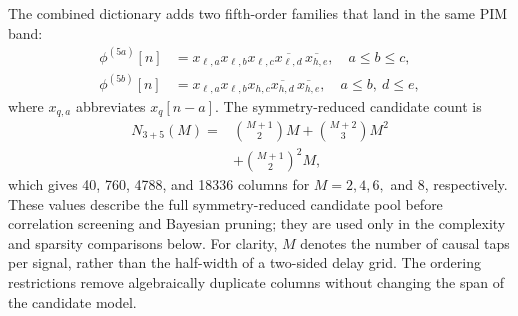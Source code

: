\documentclass[conference]{IEEEtran}
\begin{document}
The combined dictionary adds two fifth-order families that land in the same PIM band:
\begin{align}
 \phi^{(5a)}[n]&=x_{\ell,a}x_{\ell,b}x_{\ell,c}
                 \overline{x_{\ell,d}}\,\overline{x_{h,e}},
                 \quad a\leq b\leq c, \label{eq:im5a}\\
 \phi^{(5b)}[n]&=x_{\ell,a}x_{\ell,b}x_{h,c}
                 \overline{x_{h,d}}\,\overline{x_{h,e}},
                 \quad a\leq b,\ d\leq e, \label{eq:im5b}
\end{align}
where $x_{q,a}$ abbreviates $x_q[n-a]$. The symmetry-reduced candidate count is
\begin{equation}
\begin{split}
 N_{3+5}(M)={}&\binom{M+1}{2}M
 +\binom{M+2}{3}M^2\\
 &+\binom{M+1}{2}^{\!2}M,
\end{split}
\label{eq:n35}
\end{equation}
which gives 40, 760, 4788, and 18336 columns for $M=2,4,6,$ and $8$, respectively. These values describe the full symmetry-reduced candidate pool before correlation screening and Bayesian pruning; they are used only in the complexity and sparsity comparisons below. For clarity, $M$ denotes the number of causal taps per signal, rather than the half-width of a two-sided delay grid. The ordering restrictions remove algebraically duplicate columns without changing the span of the candidate model.
\end{document}
